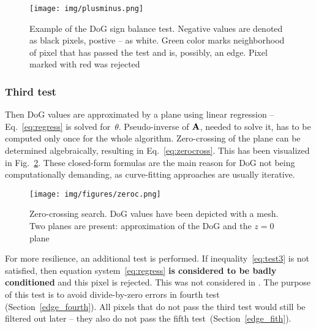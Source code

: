 \begin{figure}[ht]
	\centering\texttt{[image: img/plusminus.png]}
	\caption{ Example of the DoG sign balance test. Negative values are denoted as black pixels, postive -- as white. Green color marks neighborhood of pixel that has passed the test and is, possibly, an edge. Pixel marked with red was rejected }
	\label{fig:plusminus}
\end{figure}

\subsubsection{Third test}
\label{edge_third}

Then DoG values are approximated by a plane using linear regression -- Eq.~\ref{eq:regress} is solved for~$\theta$. Pseudo-inverse of $\textbf{A}$, needed to solve it, has to be computed only once for the whole algorithm. Zero-crossing of the plane can be determined algebraically, resulting in Eq.~\ref{eq:zerocross}. This has been visualized in Fig.~\ref{fig:zeroc}. These closed-form formulas are the main reason for DoG not being computationally demanding, as curve-fitting approaches are usually iterative.

\begin{figure}[ht]
	\centering\texttt{[image: img/figures/zeroc.png]}
	\caption{ Zero-crossing search. DoG values have been depicted with a mesh. Two planes are present: approximation of the DoG and the $z=0$ plane }
	\label{fig:zeroc}
\end{figure}

For more resilience, an additional test is performed. If inequality~\ref{eq:test3} is not satisfied, then equation system~\ref{eq:regress} \textbf{is considered to be badly conditioned} and this pixel is rejected. This was not considered in \cite{jose2015realtime}. The purpose of this test is to avoid divide-by-zero errors in fourth test (Section~\ref{edge_fourth}). All pixels that do not pass the third test would still be filtered out later -- they also do not pass the fifth test~(Section~\ref{edge_fith}).


